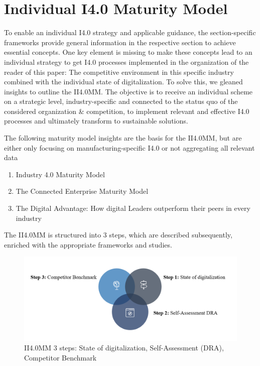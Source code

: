\section{Individual I4.0 Maturity Model}
\label{sec:i4mm}

To enable an individual \ac{I4.0} strategy and applicable guidance, the section-specific frameworks provide general information in the respective section to achieve essential concepts. One key element is missing to make these concepts lead to an individual strategy to get \ac{I4.0} processes implemented in the organization of the reader of this paper: The competitive environment in this specific industry combined with the individual state of digitalization. To solve this, we gleaned insights to outline the \ac{II4.0MM}. The objective is to receive an individual scheme on a strategic level, industry-specific and connected to the status quo of the considered organization \& competition, to implement relevant and effective \ac{I4.0} processes and ultimately transform to sustainable solutions.

The following maturity model insights are the basis for the \ac{II4.0MM}, but are either only focusing on manufacturing-specific \ac{I4.0} or not aggregating all relevant data

\begin{enumerate}
\item Industry 4.0 Maturity Model \cite{Schumacher2016161}
\item The Connected Enterprise Maturity Model \cite{RockWellAutomation-connectedEnterpriseMaturityModel}
\item The Digital Advantage: How digital Leaders outperform their peers in every industry \cite{CapgeminiMaturityModelDigitalAdvantage}
\end{enumerate}

The \ac{II4.0MM} is structured into 3 steps, which are described subsequently, enriched with the appropriate frameworks and studies.


\begin{figure}[H]
\centering
\includegraphics[width=1\columnwidth]{images/II40MM_grafik.PNG}
\caption{\ac{II4.0MM} 3 steps: State of digitalization, Self-Assessment (DRA), Competitor Benchmark}
\label{fig:II4.0MM}
\end{figure}

